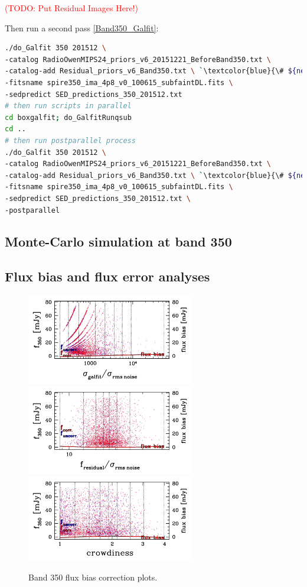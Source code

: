 \documentclass[11pt,a4paper]{article}
\begin{document}
\textcolor{red}{(TODO: Put Residual Images Here!)}

Then run a second pass \ref{Band350_Galfit}: 

\begin{lstlisting}[language=bash]
./do_Galfit 350 201512 \
-catalog RadioOwenMIPS24_priors_v6_20151221_BeforeBand350.txt \
-catalog-add Residual_priors_v6_Band350.txt \ `\textcolor{blue}{\# ${new!}$}`
-fitsname spire350_ima_4p8_v0_100615_subfaintDL.fits \
-sedpredict SED_predictions_350_201512.txt
# then run scripts in parallel 
cd boxgalfit; do_GalfitRunqsub
cd ..
# then run postparallel process
./do_Galfit 350 201512 \
-catalog RadioOwenMIPS24_priors_v6_20151221_BeforeBand350.txt \
-catalog-add Residual_priors_v6_Band350.txt \ `\textcolor{blue}{\# ${new!}$}`
-fitsname spire350_ima_4p8_v0_100615_subfaintDL.fits \
-sedpredict SED_predictions_350_201512.txt \
-postparallel
\end{lstlisting}

\subsection{Monte-Carlo simulation at band 350}
\label{Band350_Galsim}


\subsection{Flux bias and flux error analyses}
\label{Band350_simanalyses}

\begin{figure}[H]
	\caption{
	    Band 350 flux bias correction plots.
	}
	\includegraphics[width=0.65\textwidth]{galsim_350_fbias_1}
	\includegraphics[width=0.65\textwidth]{galsim_350_fbias_2}
	\includegraphics[width=0.65\textwidth]{galsim_350_fbias_3}
\end{figure}
\end{document}
